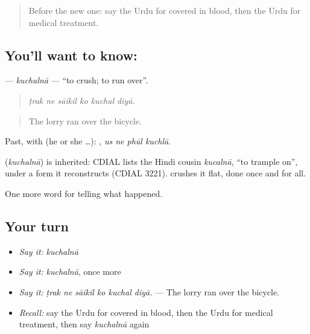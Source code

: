 \label{lesson:UR-C286-kuchalna}



\begin{quote}
Before the new one: say the Urdu for covered in blood, then the Urdu for medical treatment.
\end{quote}

\subsection*{You'll want to know: }
\textbf{} — \emph{kuchalnā} — \textquotedblleft{}to crush; to run over\textquotedblright{}.

\begin{quote}
     
\end{quote}

\begin{quote}
\emph{ṭrak ne sāikil ko kuchal diyā.}
\end{quote}

\begin{quote}
The lorry ran over the bicycle.
\end{quote}

Past, with  (he or she …):    , \emph{us ne phūl kuchlā}.

\begin{cousinweb}
\textbf{} (\emph{kuchalnā}) is inherited: CDIAL lists the Hindi cousin \emph{kucalnā}, \textquotedblleft{}to trample on\textquotedblright{}, under a form it reconstructs (CDIAL 3221). \textbf{ } crushes it flat, done once and for all.
\end{cousinweb}

\begin{grammarlens}[title={What you've built}]
One more word for telling what happened.
\end{grammarlens}

\subsection*{Your turn}
\begin{itemize}
\raggedright
  \item \emph{Say it:} \emph{kuchalnā}
  \item \emph{Say it:} \emph{kuchalnā}, once more
  \item \emph{Say it:} \emph{ṭrak ne sāikil ko kuchal diyā.} — The lorry ran over the bicycle.
  \item \emph{Recall:} say the Urdu for covered in blood, then the Urdu for medical treatment, then say \emph{kuchalnā} again
\end{itemize}

